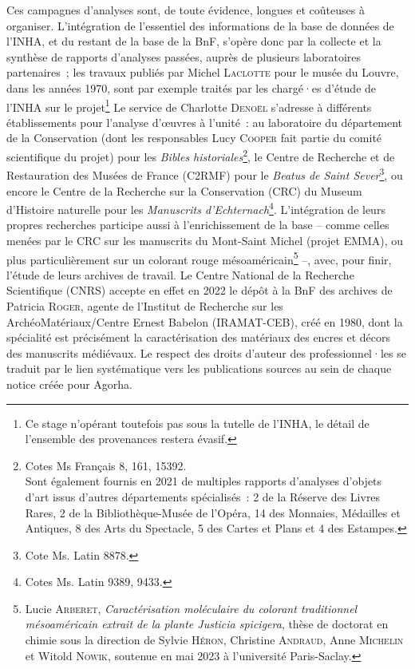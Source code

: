 \documentclass[a4paper,12pt, twoside]{book}
\begin{document}
Ces campagnes d’analyses sont, de toute évidence, longues et coûteuses à organiser. L’intégration de l’essentiel des informations de la base de données de l’INHA, et du restant de la base de la BnF, s’opère donc par la collecte et la synthèse de rapports d’analyses passées, auprès de plusieurs laboratoires partenaires~; les travaux publiés par Michel \textsc{Laclotte} pour le musée du Louvre, dans les années 1970, sont par exemple traités par les chargé·es d’étude de l’INHA sur le projet\footnote{Ce stage n’opérant toutefois pas sous la tutelle de l’INHA, le détail de l’ensemble des provenances restera évasif.} Le service de Charlotte \textsc{Denoël} s’adresse à différents établissements pour l’analyse d’œuvres à l’unité~: au laboratoire du département de la Conservation (dont les responsables Lucy \textsc{Cooper} fait partie du comité scientifique du projet) pour les \textit{Bibles historiales}\footnote{Cotes Ms Français 8, 161, 15392.\\ Sont également fournis en 2021 de multiples rapports d’analyses d’objets d’art issus d’autres départements spécialisés~: 2 de la Réserve des Livres Rares, 2 de la Bibliothèque-Musée de l’Opéra, 14 des Monnaies, Médailles et Antiques, 8 des Arts du Spectacle, 5 des Cartes et Plans et 4 des Estampes.}, le Centre de Recherche et de Restauration des Musées de France (C2RMF) pour le \textit{Beatus de Saint Sever}\footnote{Cote Ms. Latin 8878.}, ou encore le Centre de la Recherche sur la Conservation (CRC) du Museum d’Histoire naturelle pour les \textit{Manuscrits d’Echternach}\footnote{Cotes Ms. Latin 9389, 9433.}. L’intégration de leurs propres recherches participe aussi à l’enrichissement de la base – comme celles menées par le CRC sur les manuscrits du Mont-Saint Michel (projet EMMA), ou plus particulièrement sur un colorant rouge mésoaméricain\footnote{Lucie \textsc{Arberet}, \textit{Caractérisation moléculaire du colorant traditionnel mésoaméricain extrait de la plante \emph{Justicia spicigera}}, thèse de doctorat en chimie sous la direction de Sylvie \textsc{Héron}, Christine \textsc{Andraud}, Anne \textsc{Michelin} et Witold \textsc{Nowik}, soutenue en mai 2023 à l’université Paris-Saclay.} –, avec, pour finir, l’étude de leurs archives de travail. Le Centre National de la Recherche Scientifique (CNRS) accepte en effet en 2022 le dépôt à la BnF des archives de Patricia \textsc{Roger}, agente de l’Institut de Recherche sur les ArchéoMatériaux/Centre Ernest Babelon (IRAMAT-CEB), créé en 1980, dont la spécialité est précisément la caractérisation des matériaux des encres et décors des manuscrits médiévaux. Le respect des droits d’auteur des professionnel·les se traduit par le lien systématique vers les publications sources au sein de chaque notice créée pour Agorha.
\end{document}

